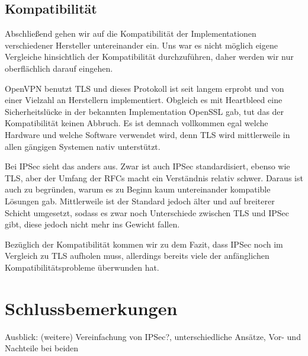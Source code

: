 \documentclass[12pt]{scrartcl}
\begin{document}
\subsection{Kompatibilität}
Abschließend gehen wir auf die Kompatibilität der Implementationen verschiedener Hersteller untereinander ein. Uns war es nicht möglich eigene Vergleiche hinsichtlich der Kompatibilität durchzuführen, daher werden wir nur oberflächlich darauf eingehen.

OpenVPN benutzt TLS und dieses Protokoll ist seit langem erprobt und von einer Vielzahl an Herstellern implementiert. Obgleich es mit Heartbleed eine Sicherheitslücke in der bekannten Implementation OpenSSL gab, tut das der Kompatibilität keinen Abbruch. Es ist demnach vollkommen egal welche Hardware und welche Software verwendet wird, denn TLS wird mittlerweile in allen gängigen Systemen nativ unterstützt.

Bei IPSec sieht das anders aus. Zwar ist auch IPSec standardisiert, ebenso wie TLS, aber der Umfang der RFCs macht ein Verständnis relativ schwer. Daraus ist auch zu begründen, warum es zu Beginn kaum untereinander kompatible Lösungen gab\cite{Alshamsi2005}. Mittlerweile ist der Standard jedoch älter und auf breiterer Schicht umgesetzt, sodass es zwar noch Unterschiede zwischen TLS und IPSec gibt, diese jedoch nicht mehr ins Gewicht fallen.

Bezüglich der Kompatibilität kommen wir zu dem Fazit, dass IPSec noch im Vergleich zu TLS aufholen muss, allerdings bereits viele der anfänglichen Kompatibilitätsprobleme überwunden hat.

\section{Schlussbemerkungen}
Ausblick: (weitere) Vereinfachung von IPSec?, unterschiedliche Ansätze, Vor- und Nachteile bei beiden

\newpage

\printbibliography
{}


\newpage
{}
\end{document}
